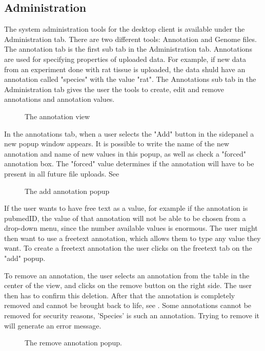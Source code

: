 \subsection{Administration}
The system administration tools for the desktop client is available under the Administration tab. There are two different tools: Annotation and Genome files. The annotation tab is the first sub tab in the Administration tab. Annotations are used for specifying properties of uploaded data. For example, if new data from an experiment done with rat tissue is uploaded, the data shuld have an annotation called "species" with the value "rat". The Annotations sub tab in the Administration tab gives the user the tools to create, edit and remove annotations and annotation values. 
\begin{figure}[htb]
	\caption{The annotation view}
	\label{fig:annotationsView}
\end{figure}

In the annotations tab, when a user selects the "Add" button in the sidepanel a new popup window appears. It is possible to write the name of the new annotation and name of new values in this popup, as well as check a "forced" annotation box. The "forced" value determines if the annotation will have to be present in all future file uploads. See 

\begin{figure}[htb]
	\caption{The add annotation popup}
	\label{fig:adm_addAnnotationPopup}
\end{figure}

If the user wants to have free text as a value, for example if the annotation is pubmedID, the value of that annotation will not be able to be chosen from a drop-down menu, since the number available values is enormous. The user might then want to use a freetext annotation, which allows them to type any value they want. To create a freetext annotation the user clicks on the freetext tab on the "add" popup. 


To remove an annotation, the user selects an annotation from the table in the center of the view, and clicks on the remove button on the right side. The user then has to confirm this deletion. After that the annotation is completely removed and cannot be brought back to life, see . Some annotations cannot be removed for security reasons, 'Species' is such an annotation. Trying to remove it will generate an error message.
\begin{figure}[h!]
\caption{The remove annotation popup.}
\label{fig:adm_desktopRemoveAnnotation}
\end{figure}

